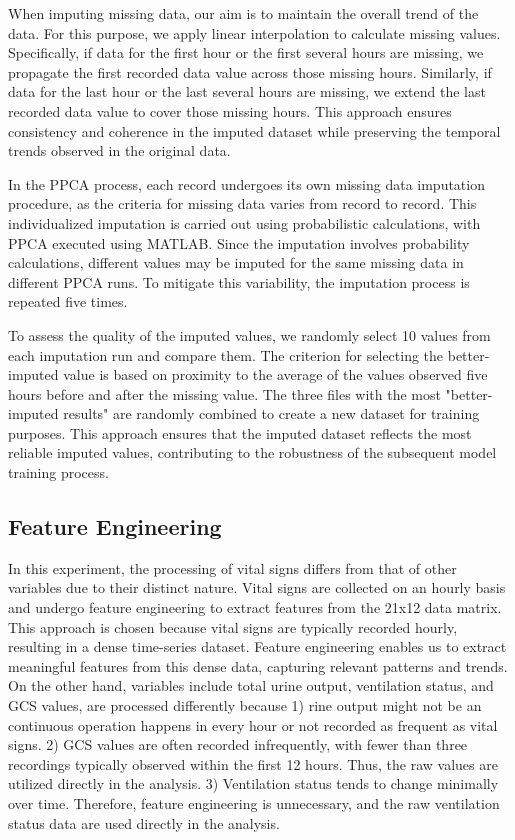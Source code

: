 \documentclass[12pt,a4paper,english
]{tunithesis}
\begin{document}
When imputing missing data, our aim is to maintain the overall trend of the data. For this purpose, we apply linear interpolation to calculate missing values. Specifically, if data for the first hour or the first several hours are missing, we propagate the first recorded data value across those missing hours. Similarly, if data for the last hour or the last several hours are missing, we extend the last recorded data value to cover those missing hours. This approach ensures consistency and coherence in the imputed dataset while preserving the temporal trends observed in the original data.

In the PPCA process, each record undergoes its own missing data imputation procedure, as the criteria for missing data varies from record to record. This individualized imputation is carried out using probabilistic calculations, with PPCA executed using MATLAB. Since the imputation involves probability calculations, different values may be imputed for the same missing data in different PPCA runs. To mitigate this variability, the imputation process is repeated five times.

To assess the quality of the imputed values, we randomly select 10 values from each imputation run and compare them. The criterion for selecting the better-imputed value is based on proximity to the average of the values observed five hours before and after the missing value. The three files with the most "better-imputed results" are randomly combined to create a new dataset for training purposes. This approach ensures that the imputed dataset reflects the most reliable imputed values, contributing to the robustness of the subsequent model training process.


\subsection{Feature Engineering}

In this experiment, the processing of vital signs differs from that of other variables due to their distinct nature. Vital signs are collected on an hourly basis and undergo feature engineering to extract features from the 21x12 data matrix. This approach is chosen because vital signs are typically recorded hourly, resulting in a dense time-series dataset. Feature engineering enables us to extract meaningful features from this dense data, capturing relevant patterns and trends. On the other hand, variables include total urine output, ventilation status, and GCS values, are processed differently because 1) rine output might not be an continuous operation happens in every hour or not recorded as frequent as vital signs. 2) GCS values are often recorded infrequently, with fewer than three recordings typically observed within the first 12 hours. Thus, the raw values are utilized directly in the analysis. 3) Ventilation status tends to change minimally over time. Therefore, feature engineering is unnecessary, and the raw ventilation status data are used directly in the analysis.
\end{document}
